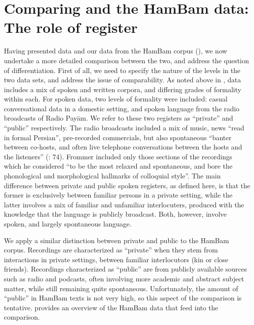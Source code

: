 \documentclass[output=paper,colorlinks,citecolor=brown,draftmode]{langscibook}
\begin{document}
\section{Comparing \citet{frommer_post-verbal_1981} and the HamBam data: The role of register}\label{Persian:5}

Having presented  data and our data from the HamBam corpus (\citealt{HaigRasekhMahand2022HamBam}), we now undertake a more detailed comparison between the two, and address the question of  differentiation. First of all, we need to specify the nature of the  levels in the two data sets, and address the issue of comparability. As noted above in ,  data includes a mix of spoken and written corpora, and differing grades of formality within each. For  spoken data, two levels of formality were included: casual conversational data in a domestic setting, and spoken language from the radio broadcasts of Radio Payām. We refer to these two registers as ``private'' and ``public'' respectively. The radio broadcasts included a mix of music, news ``read in formal Persian'', pre-recorded commercials, but also spontaneous ``banter between co-hosts, and often live telephone conversations between the hosts and the listeners'' (\citealt{frommer_post-verbal_1981}: 74). Frommer included only those sections of the recordings which he considered ``to be the most relaxed and spontaneous, and bore the phonological and morphological hallmarks of colloquial style''. The main difference between private and public spoken registers, as defined here, is that the former is exclusively between familiar persons in a private setting, while the latter involves a mix of familiar and unfamiliar interlocuters, produced with the knowledge that the language is publicly broadcast. Both, however, involve spoken, and largely spontaneous language.

We apply a similar distinction between private and public to the HamBam corpus. Recordings are characterized as ``private'' when they stem from interactions in private settings, between familiar interlocutors (kin or close friends). Recordings characterized as ``public'' are from publicly available sources such as radio and podcasts, often involving more academic and abstract subject matter, while still remaining quite spontaneous. Unfortunately, the amount of ``public''  in HamBam texts is not very high, so this aspect of the comparison is tentative.  provides an overview of the HamBam data that feed into the comparison.
\end{document}
